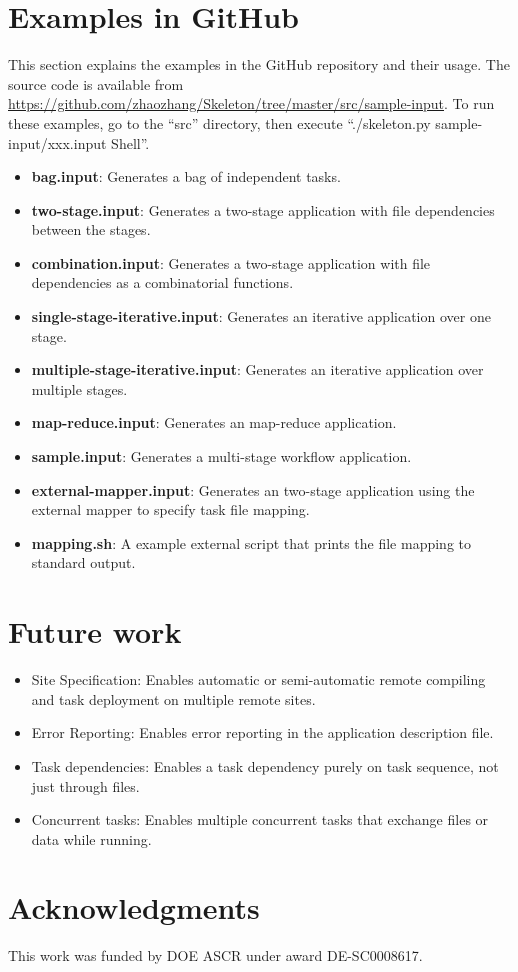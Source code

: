 \documentclass[10pt,a4paper]{article}
\begin{document}
\section{Examples in GitHub}
This section explains the examples in the GitHub repository and their usage. The source code is available from \url{https://github.com/zhaozhang/Skeleton/tree/master/src/sample-input}.
To run these examples, go to the ``src'' directory, then execute ``./skeleton.py sample-input/xxx.input Shell''.
\begin{itemize}
\item{\bf bag.input}: Generates a bag of independent tasks. 
\item{\bf two-stage.input}: Generates a two-stage application with file dependencies between the stages.
\item{\bf combination.input}: Generates a two-stage application with file dependencies as a combinatorial functions.
\item{\bf single-stage-iterative.input}: Generates an iterative application over one stage.
\item{\bf multiple-stage-iterative.input}: Generates an iterative application over multiple stages.
\item{\bf map-reduce.input}: Generates an map-reduce application.
\item{\bf sample.input}: Generates a multi-stage workflow application.
\item{\bf external-mapper.input}: Generates an two-stage application using the external mapper to specify task file mapping.
\item{\bf mapping.sh}: A example external script that prints the file mapping to standard output.
\end{itemize}

\section{Future work}

\begin{itemize}

\item{Site Specification}: Enables automatic or semi-automatic remote compiling and task deployment on multiple remote sites. 

\item{Error Reporting}: Enables error reporting in the application description file.

\item{Task dependencies}: Enables a task dependency purely on task sequence, not just through files.

\item{Concurrent tasks}: Enables multiple concurrent tasks that exchange files or data while running.


\end{itemize}

\section{Acknowledgments}

This work was funded by DOE ASCR under award DE-SC0008617.



\end{document}
